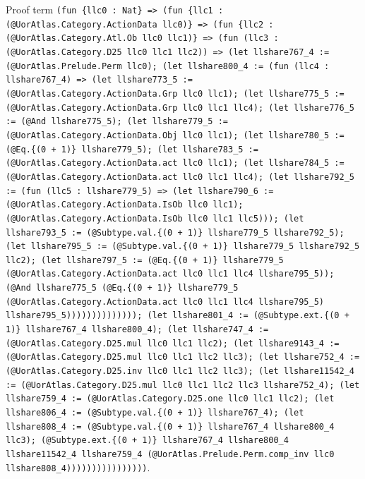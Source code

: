 \documentclass[11pt]{article}
\begin{document}
\noindent Proof term \texttt{(fun \{llc0 : Nat\} => (fun \{llc1 : (@UorAtlas.Category.ActionData llc0)\} => (fun \{llc2 : (@UorAtlas.Category.Atl.Ob llc0 llc1)\} => (fun (llc3 : (@UorAtlas.Category.D25 llc0 llc1 llc2)) => (let llshare767\_4 := (@UorAtlas.Prelude.Perm llc0); (let llshare800\_4 := (fun (llc4 : llshare767\_4) => (let llshare773\_5 := (@UorAtlas.Category.ActionData.Grp llc0 llc1); (let llshare775\_5 := (@UorAtlas.Category.ActionData.Grp llc0 llc1 llc4); (let llshare776\_5 := (@And llshare775\_5); (let llshare779\_5 := (@UorAtlas.Category.ActionData.Obj llc0 llc1); (let llshare780\_5 := (@Eq.\{(0 + 1)\} llshare779\_5); (let llshare783\_5 := (@UorAtlas.Category.ActionData.act llc0 llc1); (let llshare784\_5 := (@UorAtlas.Category.ActionData.act llc0 llc1 llc4); (let llshare792\_5 := (fun (llc5 : llshare779\_5) => (let llshare790\_6 := (@UorAtlas.Category.ActionData.IsOb llc0 llc1); (@UorAtlas.Category.ActionData.IsOb llc0 llc1 llc5))); (let llshare793\_5 := (@Subtype.val.\{(0 + 1)\} llshare779\_5 llshare792\_5); (let llshare795\_5 := (@Subtype.val.\{(0 + 1)\} llshare779\_5 llshare792\_5 llc2); (let llshare797\_5 := (@Eq.\{(0 + 1)\} llshare779\_5 (@UorAtlas.Category.ActionData.act llc0 llc1 llc4 llshare795\_5)); (@And llshare775\_5 (@Eq.\{(0 + 1)\} llshare779\_5 (@UorAtlas.Category.ActionData.act llc0 llc1 llc4 llshare795\_5) llshare795\_5)))))))))))))); (let llshare801\_4 := (@Subtype.ext.\{(0 + 1)\} llshare767\_4 llshare800\_4); (let llshare747\_4 := (@UorAtlas.Category.D25.mul llc0 llc1 llc2); (let llshare9143\_4 := (@UorAtlas.Category.D25.mul llc0 llc1 llc2 llc3); (let llshare752\_4 := (@UorAtlas.Category.D25.inv llc0 llc1 llc2 llc3); (let llshare11542\_4 := (@UorAtlas.Category.D25.mul llc0 llc1 llc2 llc3 llshare752\_4); (let llshare759\_4 := (@UorAtlas.Category.D25.one llc0 llc1 llc2); (let llshare806\_4 := (@Subtype.val.\{(0 + 1)\} llshare767\_4); (let llshare808\_4 := (@Subtype.val.\{(0 + 1)\} llshare767\_4 llshare800\_4 llc3); (@Subtype.ext.\{(0 + 1)\} llshare767\_4 llshare800\_4 llshare11542\_4 llshare759\_4 (@UorAtlas.Prelude.Perm.comp\_inv llc0 llshare808\_4))))))))))))))))}.\par
\end{document}
